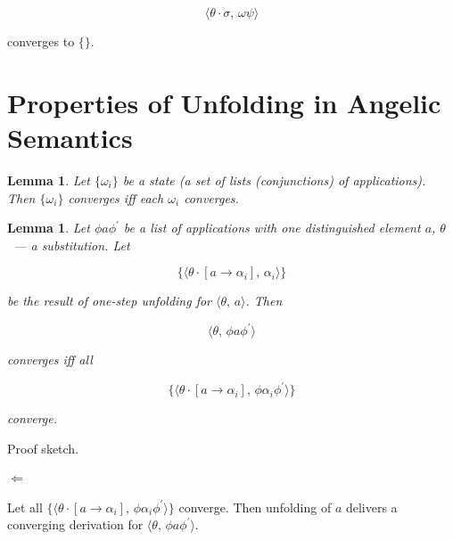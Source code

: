 \documentclass{article}[12pt]
\newcommand{\inbr}[1]{\langle #1 \rangle}
\newtheorem{lemma}[theorem]{Lemma}
\begin{document}
\[
\inbr{\theta\cdot\sigma,\,\omega\psi}
\]

converges to $\{\}$.

\section{Properties of Unfolding in Angelic Semantics}

\begin{lemma}
  Let $\{\omega_i\}$ be a state (a set of lists (conjunctions) of applications). Then $\{\omega_i\}$ converges iff each $\omega_i$ converges.
\end{lemma}

\begin{lemma}
Let $\phi a \phi^\prime$ be a list of applications with one distinguished element $a$, $\theta$~--- a substitution. Let

\[
\{\inbr{\theta\cdot[a\to\alpha_i],\,\alpha_i}\}
\]

be the result of one-step unfolding for $\inbr{\theta,\,a}$. Then

\[
\inbr{\theta,\,\phi a \phi^\prime}
\]

converges iff all

\[
\{\inbr{\theta\cdot[a\to\alpha_i],\,\phi\alpha_i\phi^\prime}\}
\]

converge.
\end{lemma}

Proof sketch.

\paragraph{$\Leftarrow$} Let all $\{\inbr{\theta\cdot[a\to\alpha_i],\,\phi\alpha_i\phi^\prime}\}$ converge. Then unfolding of $a$ delivers a converging derivation for $\inbr{\theta,\,\phi a \phi^\prime}$.
\end{document}
